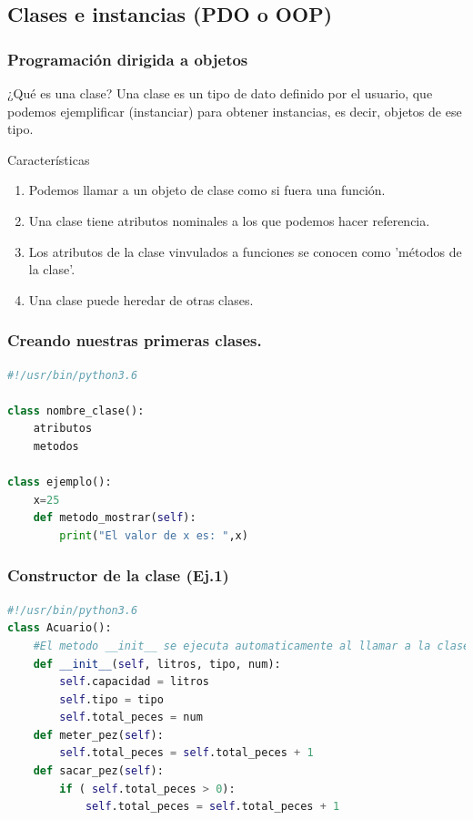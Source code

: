 \documentclass{beamer}
\begin{document}
\subsection{Clases e instancias (PDO o OOP)}
\begin{frame}
\frametitle{Programación dirigida a objetos}
\begin{block}{¿Qué es una clase?}
Una clase es un tipo de dato definido por el usuario, que podemos ejemplificar (instanciar) para obtener instancias, es decir, objetos de ese tipo.
\end{block} \pause
\begin{block}{Características}
\begin{enumerate}
\item Podemos llamar a un objeto de clase como si fuera una función.
\item Una clase tiene atributos nominales a los que podemos hacer referencia.
\item Los atributos de la clase vinvulados a funciones se conocen como 'métodos de la clase'.
\item Una clase puede heredar de otras clases.
\end{enumerate}
\end{block}
\end{frame}

\begin{frame}[fragile]
\frametitle{Creando nuestras primeras clases.}
\begin{lstlisting}[language=Python]
#!/usr/bin/python3.6

class nombre_clase():
	atributos
	metodos

class ejemplo():
	x=25
	def metodo_mostrar(self):
		print("El valor de x es: ",x)
\end{lstlisting}
\end{frame}

\begin{frame}[fragile]
\frametitle{Constructor de la clase (Ej.1)}
\begin{lstlisting}[language=Python]
#!/usr/bin/python3.6
class Acuario():
	#El metodo __init__ se ejecuta automaticamente al llamar a la clase
	def __init__(self, litros, tipo, num):
		self.capacidad = litros
		self.tipo = tipo
		self.total_peces = num
	def meter_pez(self):
		self.total_peces = self.total_peces + 1
	def sacar_pez(self):
		if ( self.total_peces > 0):
			self.total_peces = self.total_peces + 1
			
\end{lstlisting}
\end{frame}
\end{document}

